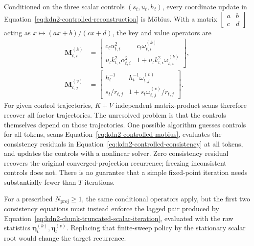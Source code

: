 \documentclass[11pt]{article}
\newcommand{\ve}[1]{\boldsymbol{#1}}
\begin{document}
Conditioned on the three scalar controls $(s_t,u_t,h_t)$, every coordinate update in
Equation~\eqref{eq:kdn2-controlled-reconstruction} is M\"obius.  With a matrix
$\left[\begin{smallmatrix}a&b\\c&d\end{smallmatrix}\right]$ acting as
$x\mapsto(ax+b)/(cx+d)$, the key and value operators are
\begin{equation}
\begin{aligned}
  \ve{M}^{(k)}_{t,i}
  &=\begin{bmatrix}
      c_t\alpha_{t,i}^2 & c_t\omega^{(k)}_{t,i}\\
      u_tk_{t,i}^2\alpha_{t,i}^2 & 1+u_tk_{t,i}^2\omega^{(k)}_{t,i}
    \end{bmatrix},\\
  \ve{M}^{(v)}_{t,j}
  &=\begin{bmatrix}
      h_t^{-1} & h_t^{-1}\omega^{(v)}_{t,j}\\
      s_t/r_{t,j} & 1+s_t\omega^{(v)}_{t,j}/r_{t,j}
    \end{bmatrix}.
\end{aligned}
  \label{eq:kdn2-controlled-mobius}
\end{equation}
For given control trajectories, $K+V$ independent matrix-product scans therefore recover all
factor trajectories.  The unresolved problem is that the controls themselves depend on those
trajectories.  One possible algorithm guesses controls for all tokens, scans
Equation~\eqref{eq:kdn2-controlled-mobius}, evaluates the consistency residuals in
Equation~\eqref{eq:kdn2-controlled-consistency} at all tokens, and updates the controls with a
nonlinear solver.  Zero consistency residual recovers the original converged-projection
recurrence; freezing inconsistent controls does not.  There is no guarantee that a simple
fixed-point iteration needs substantially fewer than $T$ iterations.

For a prescribed $N_{\mathrm{proj}}\ge1$, the same conditional operators apply, but the first
two consistency equations must instead enforce the lagged pair produced by
Equation~\eqref{eq:kdn2-chunk-truncated-scalar-iteration}, evaluated with the raw statistics
$\ve{\eta}^{(k)}_t,\ve{\eta}^{(v)}_t$.  Replacing that finite-sweep policy by the stationary
scalar root would change the target recurrence.
\end{document}
